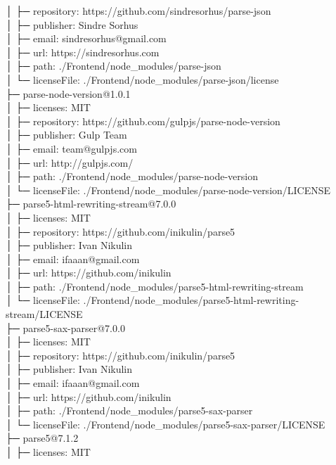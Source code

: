 │  ├─ repository: https://github.com/sindresorhus/parse-json\\
│  ├─ publisher: Sindre Sorhus\\
│  ├─ email: sindresorhus@gmail.com\\
│  ├─ url: https://sindresorhus.com\\
│  ├─ path: ./Frontend/node\_modules/parse-json\\
│  └─ licenseFile: ./Frontend/node\_modules/parse-json/license\\
├─ parse-node-version@1.0.1\\
│  ├─ licenses: MIT\\
│  ├─ repository: https://github.com/gulpjs/parse-node-version\\
│  ├─ publisher: Gulp Team\\
│  ├─ email: team@gulpjs.com\\
│  ├─ url: http://gulpjs.com/\\
│  ├─ path: ./Frontend/node\_modules/parse-node-version\\
│  └─ licenseFile: ./Frontend/node\_modules/parse-node-version/LICENSE\\
├─ parse5-html-rewriting-stream@7.0.0\\
│  ├─ licenses: MIT\\
│  ├─ repository: https://github.com/inikulin/parse5\\
│  ├─ publisher: Ivan Nikulin\\
│  ├─ email: ifaaan@gmail.com\\
│  ├─ url: https://github.com/inikulin\\
│  ├─ path: ./Frontend/node\_modules/parse5-html-rewriting-stream\\
│  └─ licenseFile: ./Frontend/node\_modules/parse5-html-rewriting-stream/LICENSE\\
├─ parse5-sax-parser@7.0.0\\
│  ├─ licenses: MIT\\
│  ├─ repository: https://github.com/inikulin/parse5\\
│  ├─ publisher: Ivan Nikulin\\
│  ├─ email: ifaaan@gmail.com\\
│  ├─ url: https://github.com/inikulin\\
│  ├─ path: ./Frontend/node\_modules/parse5-sax-parser\\
│  └─ licenseFile: ./Frontend/node\_modules/parse5-sax-parser/LICENSE\\
├─ parse5@7.1.2\\
│  ├─ licenses: MIT\\
